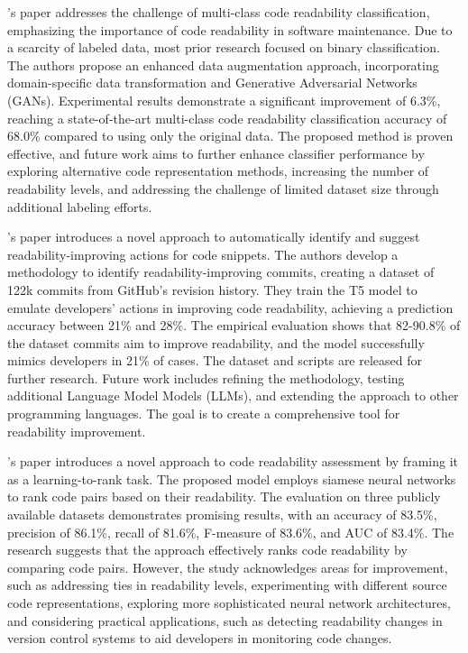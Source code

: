 \documentclass[%
class=scrreprt,
chapterprefix=false,%
open=right,%
twoside=false,%
paper=a4,%
logofile={Logo\_zentral\_farbig\_EN.png},%
thesistype=master,%
UKenglish,%
]{se2thesis}
\begin{document}
	\citeauthor{mi2022enhanced}'s paper addresses the challenge of multi-class code readability classification, emphasizing the importance of code readability in software maintenance. Due to a scarcity of labeled data, most prior research focused on binary classification. The authors propose an enhanced data augmentation approach, incorporating domain-specific data transformation and Generative Adversarial Networks (GANs). Experimental results demonstrate a significant improvement of 6.3\%, reaching a state-of-the-art multi-class code readability classification accuracy of 68.0\% compared to using only the original data. The proposed method is proven effective, and future work aims to further enhance classifier performance by exploring alternative code representation methods, increasing the number of readability levels, and addressing the challenge of limited dataset size through additional labeling efforts.
	
	\citeauthor{vitale2023using}'s paper introduces a novel approach to automatically identify and suggest readability-improving actions for code snippets. The authors develop a methodology to identify readability-improving commits, creating a dataset of 122k commits from GitHub's revision history. They train the T5 model to emulate developers' actions in improving code readability, achieving a prediction accuracy between 21\% and 28\%. The empirical evaluation shows that 82-90.8\% of the dataset commits aim to improve readability, and the model successfully mimics developers in 21\% of cases. The dataset and scripts are released for further research. Future work includes refining the methodology, testing additional Language Model Models (LLMs), and extending the approach to other programming languages. The goal is to create a comprehensive tool for readability improvement.
	
	\citeauthor{mi2022rank}'s paper introduces a novel approach to code readability assessment by framing it as a learning-to-rank task. The proposed model employs siamese neural networks to rank code pairs based on their readability. The evaluation on three publicly available datasets demonstrates promising results, with an accuracy of 83.5\%, precision of 86.1\%, recall of 81.6\%, F-measure of 83.6\%, and AUC of 83.4\%. The research suggests that the approach effectively ranks code readability by comparing code pairs. However, the study acknowledges areas for improvement, such as addressing ties in readability levels, experimenting with different source code representations, exploring more sophisticated neural network architectures, and considering practical applications, such as detecting readability changes in version control systems to aid developers in monitoring code changes. 
	
\end{document}
